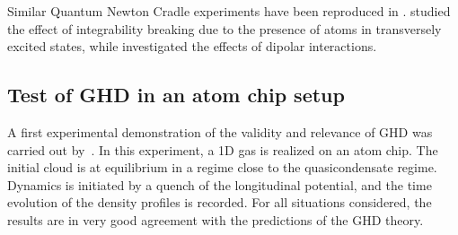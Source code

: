 \documentclass[onecolumn,amsfonts,showpacs,superscriptaddress]{revtex4-1}
\begin{document}
Similar Quantum Newton Cradle experiments have been reproduced in \citep{tang_thermalization_2018,schemmer2019generalized,li_relaxation_2020}. \cite{li_relaxation_2020} studied the effect of integrability breaking due to the presence of atoms in transversely excited states, while \cite{tang_thermalization_2018} investigated the effects  of dipolar interactions.





\subsection{Test of GHD in an atom chip setup}
A first experimental demonstration 
of the validity and relevance of GHD was carried out  by~\cite{schemmer2019generalized}.
In this experiment, a 1D gas is realized on an atom chip. 
The initial cloud is at equilibrium
in a regime close to the quasicondensate regime.
Dynamics is initiated by a quench of the longitudinal potential, and the time evolution of the density profiles is recorded. For all situations considered, the results are in very good agreement with the predictions of the GHD theory.
\end{document}
